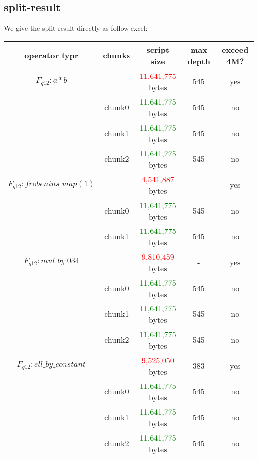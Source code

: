 \subsection{split-result}

We give the split result directly as follow excel:

\begin{center}
\begin{tabular}{|c|c|c|c|c|} \hline
    operator typr & chunks & script size & max depth & exceed 4M? \\ \hline
    $F_{q12}: a * b$ & & \textcolor{red}{11,641,775} bytes & 545 & yes \\ \hline
     & chunk0 & \textcolor{green}{11,641,775} bytes & 545 & no \\ \hline
     & chunk1 & \textcolor{green}{11,641,775} bytes & 545 & no \\ \hline
     & chunk2 & \textcolor{green}{11,641,775} bytes & 545 & no \\ \hline
    $F_{q12}: frobenius\_map(1)$ & & \textcolor{red}{4,541,887} bytes & - & yes \\ \hline
    & chunk0 & \textcolor{green}{11,641,775} bytes & 545 & no \\ \hline
    & chunk1 & \textcolor{green}{11,641,775} bytes & 545 & no \\ \hline
    $F_{q12}: mul\_by\_034$ & & \textcolor{red}{9,810,459} bytes & - & yes \\ \hline
    & chunk0 & \textcolor{green}{11,641,775} bytes & 545 & no \\ \hline
    & chunk1 & \textcolor{green}{11,641,775} bytes & 545 & no \\ \hline
    & chunk2 & \textcolor{green}{11,641,775} bytes & 545 & no \\ \hline
    $F_{q12}: ell\_by\_constant$ & & \textcolor{red}{9,525,050} bytes & 383 & yes \\ \hline
    & chunk0 & \textcolor{green}{11,641,775} bytes & 545 & no \\ \hline
    & chunk1 & \textcolor{green}{11,641,775} bytes & 545 & no \\ \hline
    & chunk2 & \textcolor{green}{11,641,775} bytes & 545 & no \\ \hline
\end{tabular}
\end{center}
